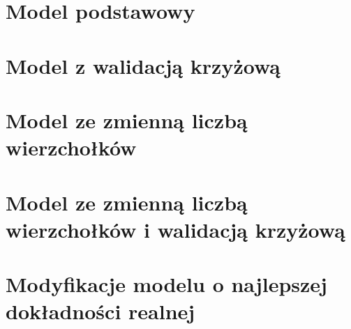 
\section{Model podstawowy}


\section{Model z walidacją krzyżową}


\section{Model ze zmienną liczbą wierzchołków}


\section{Model ze zmienną liczbą wierzchołków i walidacją krzyżową}


\section{Modyfikacje modelu o najlepszej dokładności realnej}
